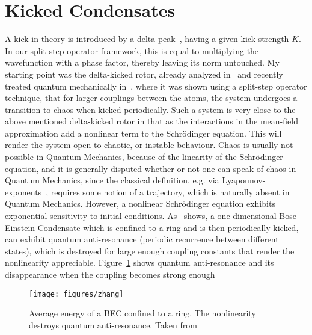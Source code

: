 \section{Kicked Condensates}
A kick in theory is introduced by a delta peak~\cite{reichl}, having a given kick strength $K$.
In our split-step operator framework, this is equal to multiplying the wavefunction with a phase factor, 
thereby leaving its norm untouched.
My starting point was the delta-kicked rotor, already analyzed in~\cite{reichl} and recently treated quantum mechanically in~\cite{zhang}, where
it was shown using a split-step operator technique, that for larger couplings between the atoms, the system undergoes a
transition to chaos when kicked periodically. Such a system is very close to the above mentioned delta-kicked rotor in that
as the interactions in the mean-field approximation add a nonlinear term to the Schr\"odinger equation. This will render the
system open to chaotic, or instable behaviour. Chaos is usually not possible in Quantum Mechanics, because of the linearity
of the Schr\"odinger equation, and it is generally disputed whether or not one can speak of chaos in Quantum Mechanics,
since the classical definition, e.g. via Lyapounov-exponents~\cite{arnold}, requires some notion of a trajectory, which is
naturally absent in Quantum Mechanics. However, a nonlinear Schr\"odinger equation exhibits exponential sensitivity to
initial conditions. As~\cite{zhang} shows, a one-dimensional Bose-Einstein Condensate which is confined to a ring and is then
periodically kicked, can exhibit quantum anti-resonance (periodic recurrence between different states), which is destroyed
for large enough coupling constants that render the nonlinearity appreciable. Figure~\ref{fig:zhang} shows quantum anti-resonance and its disappearance when the coupling becomes strong enough

\begin{figure}[H]
\begin{center}
\texttt{[image: figures/zhang]}
\caption{Average energy of a BEC confined to a ring. The nonlinearity destroys quantum anti-resonance. Taken from~\cite{zhang}}
\label{fig:zhang}
\end{center}
\end{figure}

